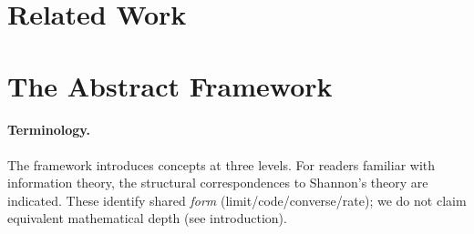 \documentclass[11pt,a4paper]{article}
\begin{document}
\section{Related Work}
\label{sec:related}



\section{The Abstract Framework}
\label{sec:framework}

\paragraph{Terminology.}
The framework introduces concepts at three levels.  For readers familiar
with information theory, the structural correspondences to Shannon's
theory are indicated.  These identify shared \emph{form}
(limit/code/converse/rate); we do not claim equivalent mathematical
depth (see introduction).
\end{document}
